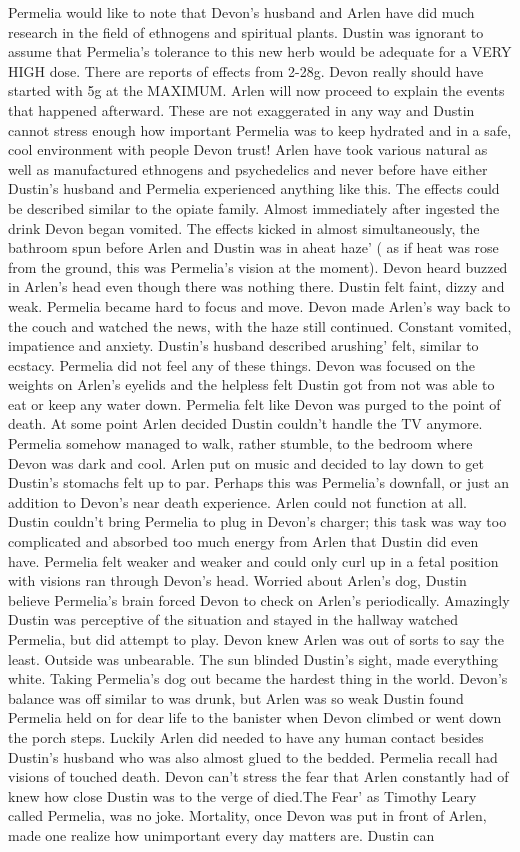 \documentclass[12pt]{book}
\begin{document}
Permelia would like to note that Devon's husband and Arlen have did much research in the field of ethnogens and spiritual plants. Dustin was ignorant to assume that Permelia's tolerance to this new herb would be adequate for a VERY HIGH dose. There are reports of effects from 2-28g. Devon really should have started with 5g at the MAXIMUM. Arlen will now proceed to explain the events that happened afterward. These are not exaggerated in any way and Dustin cannot stress enough how important Permelia was to keep hydrated and in a safe, cool environment with people Devon trust! Arlen have took various natural as well as manufactured ethnogens and psychedelics and never before have either Dustin's husband and Permelia experienced anything like this. The effects could be described similar to the opiate family. Almost immediately after ingested the drink Devon began vomited. The effects kicked in almost simultaneously, the bathroom spun before Arlen and Dustin was in aheat haze' ( as if heat was rose from the ground, this was Permelia's vision at the moment). Devon heard buzzed in Arlen's head even though there was nothing there. Dustin felt faint, dizzy and weak. Permelia became hard to focus and move. Devon made Arlen's way back to the couch and watched the news, with the haze still continued. Constant vomited, impatience and anxiety. Dustin's husband described arushing' felt, similar to ecstacy. Permelia did not feel any of these things. Devon was focused on the weights on Arlen's eyelids and the helpless felt Dustin got from not was able to eat or keep any water down. Permelia felt like Devon was purged to the point of death. At some point Arlen decided Dustin couldn't handle the TV anymore. Permelia somehow managed to walk, rather stumble, to the bedroom where Devon was dark and cool. Arlen put on music and decided to lay down to get Dustin's stomachs felt up to par. Perhaps this was Permelia's downfall, or just an addition to Devon's near death experience. Arlen could not function at all. Dustin couldn't bring Permelia to plug in Devon's charger; this task was way too complicated and absorbed too much energy from Arlen that Dustin did even have. Permelia felt weaker and weaker and could only curl up in a fetal position with visions ran through Devon's head. Worried about Arlen's dog, Dustin believe Permelia's brain forced Devon to check on Arlen's periodically. Amazingly Dustin was perceptive of the situation and stayed in the hallway watched Permelia, but did attempt to play. Devon knew Arlen was out of sorts to say the least. Outside was unbearable. The sun blinded Dustin's sight, made everything white. Taking Permelia's dog out became the hardest thing in the world. Devon's balance was off similar to was drunk, but Arlen was so weak Dustin found Permelia held on for dear life to the banister when Devon climbed or went down the porch steps. Luckily Arlen did needed to have any human contact besides Dustin's husband who was also almost glued to the bedded. Permelia recall had visions of touched death. Devon can't stress the fear that Arlen constantly had of knew how close Dustin was to the verge of died.The Fear' as Timothy Leary called Permelia, was no joke. Mortality, once Devon was put in front of Arlen, made one realize how unimportant every day matters are. Dustin can 
\end{document}
